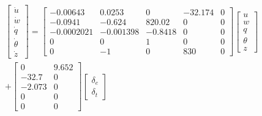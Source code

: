 \begin{equation}
    \label{eq:motoLongitudinale}
    \begin{split}
        \begin{bmatrix}
            \dot{u}      \\
            \dot{w}      \\
            \dot{q}      \\
            \dot{\theta} \\
            \dot{z}
        \end{bmatrix} = \begin{bmatrix}
                            -0.00643   & 0.0253    & 0       & -32.174 & 0 \\
                            -0.0941    & -0.624    & 820.02  & 0       & 0 \\
                            -0.0002021 & -0.001398 & -0.8418 & 0       & 0 \\
                            0          & 0         & 1       & 0       & 0 \\
                            0          & -1        & 0       & 830     & 0
                        \end{bmatrix} \begin{bmatrix}
                                          u      \\
                                          w      \\
                                          q      \\
                                          \theta \\
                                          z
                                      \end{bmatrix} \\ + \begin{bmatrix}
            0      & 9.652 \\
            -32.7  & 0     \\
            -2.073 & 0     \\
            0      & 0     \\
            0      & 0
        \end{bmatrix} \begin{bmatrix}
            \delta_e \\
            \delta_t
        \end{bmatrix}
    \end{split}
\end{equation}

